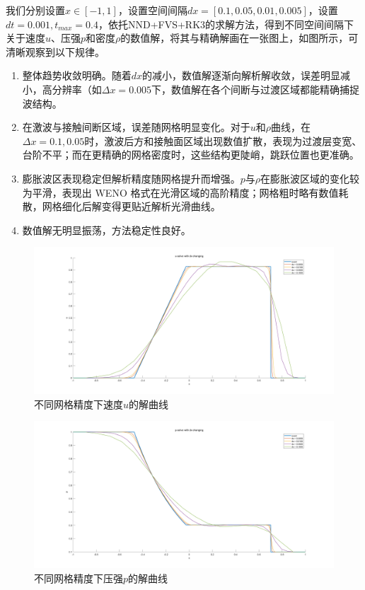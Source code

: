 \documentclass[12pt,a4paper]{article}%
\begin{document}
		我们分别设置$x \in [-1,1]$，设置空间间隔$dx=[0.1,0.05,0.01,0.005]$，设置$dt=0.001,t_{max} = 0.4$，依托NND+FVS+RK3的求解方法，得到不同空间间隔下关于速度$u$、压强$p$和密度$\rho$的数值解，将其与精确解画在一张图上，如图所示，可清晰观察到以下规律。
		\begin{enumerate}
			\item 整体趋势收敛明确。随着$dx$的减小，数值解逐渐向解析解收敛，误差明显减小，高分辨率（如$\Delta x = 0.005$下，数值解在各个间断与过渡区域都能精确捕捉波结构。
			\item 在激波与接触间断区域，误差随网格明显变化。对于$u$和$\rho$曲线，在$\Delta x = 0.1,0.05$时，激波后方和接触面区域出现数值扩散，表现为过渡层变宽、台阶不平；而在更精确的网格密度时，这些结构更陡峭，跳跃位置也更准确。
			\item 
			膨胀波区表现稳定但解析精度随网格提升而增强。$p$与$\rho$在膨胀波区域的变化较为平滑，表现出 WENO 格式在光滑区域的高阶精度；网格粗时略有数值耗散，网格细化后解变得更贴近解析光滑曲线。
			\item 数值解无明显振荡，方法稳定性良好。
		\end{enumerate}
		\begin{figure}[H]
		\centering
		\begin{minipage}{0.83\textwidth}
			\centering
			\includegraphics[width=\textwidth]{./fig/u.png}
			\caption{\fontsize{10pt}{15pt}\selectfont 不同网格精度下速度$u$的解曲线}
		\end{minipage}
		\end{figure}
		\begin{figure}[H]
			\centering
			\begin{minipage}{0.83\textwidth}
				\centering
				\includegraphics[width=\textwidth]{./fig/p.png}
				\caption{\fontsize{10pt}{15pt}\selectfont 不同网格精度下压强$p$的解曲线}
			\end{minipage}
		\end{figure}
\end{document}
